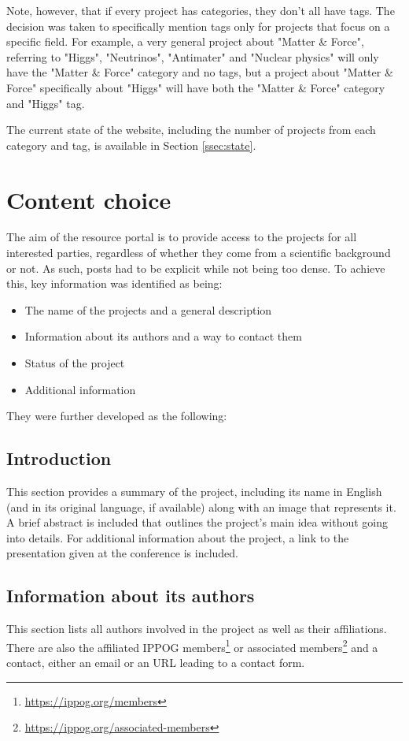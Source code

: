 Note, however, that if every project has categories, they don't all have tags. The decision was taken to specifically mention tags only for projects that focus on a specific field. For example, a very general project about "Matter \& Force", referring to "Higgs", "Neutrinos", "Antimater" and "Nuclear physics" will only have the "Matter \& Force" category and no tags, but a project about "Matter \& Force" specifically about "Higgs" will have both the "Matter \& Force" category and "Higgs" tag.

The current state of the website, including the number of projects from each category and tag, is available in Section \ref{ssec:state}.

\section{Content choice}\label{ssec:content}

The aim of the resource portal is to provide access to the projects for all interested parties, regardless of whether they come from a scientific background or not. As such, posts had to be explicit while not being too dense. To achieve this, key information was identified as being:
\begin{itemize}
    \item The name of the projects and a general description
    \item Information about its authors and a way to contact them
    \item Status of the project
    \item Additional information
\end{itemize}

They were further developed as the following:

\subsection*{Introduction}
This section provides a summary of the project, including its name in English (and in its original language, if available) along with an image that represents it. A brief abstract is included that outlines the project's main idea without going into details. For additional information about the project, a link to the presentation given at the conference is included.

\subsection*{Information about its authors}
This section lists all authors involved in the project as well as their affiliations. There are also the affiliated IPPOG members\footnote{\href{https://ippog.org/members}{https://ippog.org/members}} or associated members\footnote{\href{https://ippog.org/associated-members}{https://ippog.org/associated-members}} and a contact, either an email or an URL leading to a contact form.

